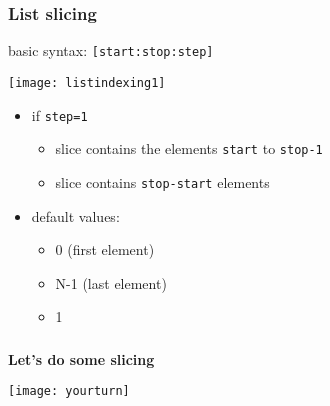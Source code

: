 \begin{frame}[fragile]\frametitle{List slicing}

 basic syntax: \lstinline{[start:stop:step]}

 \vspace{0.2truecm}
 \begin{center}
  \texttt{[image: listindexing1]}
 \end{center}
 \begin{itemize}
  \item if \lstinline{step=1}
  \begin{itemize}
      \item slice contains the elements \lstinline{start} to \lstinline{stop-1}
      \item slice contains \lstinline{stop-start} elements
  \end{itemize}
  \item default values:
  \begin{itemize}
      \item {} 0 (first element)
      \item {} N-1 (last element)
      \item {} 1
  \end{itemize}
 \end{itemize}
\end{frame}

\begin{frame}[fragile]\frametitle{}
 \begin{center}
  \textbf{\large\bfseries Let's do some slicing}

  \vspace{0.5truecm}
  \texttt{[image: yourturn]}
 \end{center}
\end{frame}

